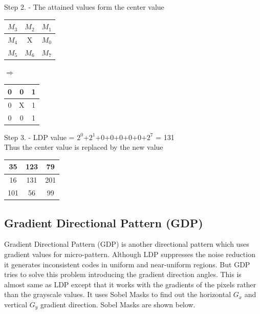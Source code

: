 \documentclass[conference]{IEEEtran}
\begin{document}
\begin{center}
	Step 2. - The attained values form the center value\\
\end{center}
\begin{center}
	\begin{tabular}{|c|c|c|}
		\hline
		$M_3$ & $M_2$ & $M_1$ \\
		\hline
		$M_4$ & X & $M_0$ \\
		\hline
		$M_5$ & $M_6$ & $M_7$ \\
		\hline
	\end{tabular}
	$\Longrightarrow$
	\begin{tabular}{|c|c|c|}
		\hline
		0 & 0 & 1 \\
		\hline
		0 & X & 1 \\
		\hline
		0 & 0 & 1 \\
		\hline
	\end{tabular}
\end{center}

\begin{center}
	Step 3. - LDP value = $2^0$+$2^1$+0+0+0+0+0+$2^7$ = 131\\
	Thus the center value is replaced by the new value
\end{center}
\begin{center}
	\begin{tabular}{|c|c|c|}
		\hline
		35 & 123 & 79 \\
		\hline
		16 & 131 & 201 \\
		\hline
		101 & 56 & 99 \\
		\hline
	\end{tabular}
\end{center}

\subsection{Gradient Directional Pattern (GDP)}
Gradient Directional Pattern (GDP) \cite{2012GDP} is another directional pattern which uses gradient values for micro-pattern. Although LDP \cite{2010LDP} suppresses the noise reduction it generates inconsistent codes in uniform and near-uniform regions. But GDP tries to solve this problem introducing the gradient direction angles. This is almost same as LDP except that it works with the gradients of the pixels rather than the grayscale values. It uses Sobel Masks to find out the horizontal $G_x$ and vertical $G_y$ gradient direction. Sobel Masks are shown below.
\end{document}
